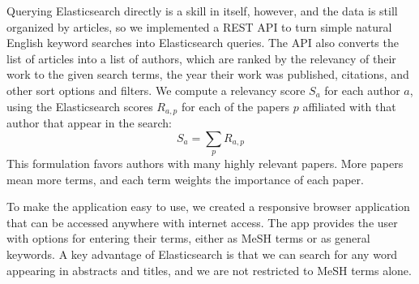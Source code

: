 Querying Elasticsearch directly is a skill in itself, however, and the data is still organized by articles, so we implemented a REST API to turn simple natural English keyword searches into Elasticsearch queries. The API also converts the list of articles into a list of authors, which are ranked by the relevancy of their work to the given search terms, the year their work was published, citations, and other sort options and filters. We compute a relevancy score $S_a$ for each author $a$, using the Elasticsearch scores $R_{a, p}$ for each of the papers $p$ affiliated with that author that appear in the search:
$$
S_a = \sum_{p} R_{a, p}
$$
This formulation favors authors with many highly relevant papers. More papers mean more terms, and each term weights the importance of each paper.

To make the application easy to use, we created a responsive browser application that can be accessed anywhere with internet access. The app provides the user with options for entering their terms, either as MeSH terms or as general keywords. A key advantage of Elasticsearch is that we can search for any word appearing in abstracts and titles, and we are not restricted to MeSH terms alone.